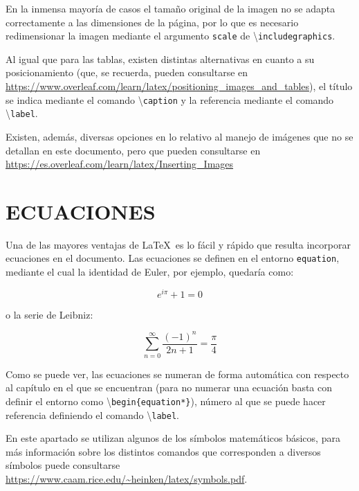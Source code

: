 En la inmensa mayoría de casos el tamaño original de la imagen no se adapta correctamente a las dimensiones de la página, por lo que es necesario redimensionar la imagen mediante el argumento \texttt{scale} de \textbackslash\texttt{includegraphics}. 

Al igual que para las tablas, existen distintas alternativas en cuanto a su posicionamiento (que, se recuerda, pueden consultarse en \url{https://www.overleaf.com/learn/latex/positioning_images_and_tables}), el título se indica mediante el comando \textbackslash\texttt{caption} y la referencia mediante el comando \textbackslash\texttt{label}. 

Existen, además, diversas opciones en lo relativo al manejo de imágenes que no se detallan en este documento, pero que pueden consultarse en \url{https://es.overleaf.com/learn/latex/Inserting_Images} 




\newpage
\section{ECUACIONES} \label{sec:ecuaciones}

Una de las mayores ventajas de \LaTeX \ es lo fácil y rápido que resulta incorporar ecuaciones en el documento. Las ecuaciones se definen en el entorno \texttt{equation}, mediante el cual la identidad de Euler, por ejemplo, quedaría como:

\begin{equation}
    e^{i\pi} + 1 = 0
    \label{eq:euler}
\end{equation}

o la serie de Leibniz:

\begin{equation}
    \sum_{n=0}^\infty \frac{(-1)^n}{2n+1} = \frac{\pi}{4}
    \label{eq:leibniz}
\end{equation}

Como se puede ver, las ecuaciones se numeran de forma automática con respecto al capítulo en el que se encuentran (para no numerar una ecuación basta con definir el entorno como \textbackslash\texttt{begin\{equation*\}}), número al que se puede hacer referencia definiendo el comando \textbackslash\texttt{label}.

En este apartado se utilizan algunos de los símbolos matemáticos básicos, para más información sobre los distintos comandos que corresponden a diversos símbolos puede consultarse \url{https://www.caam.rice.edu/~heinken/latex/symbols.pdf}.


